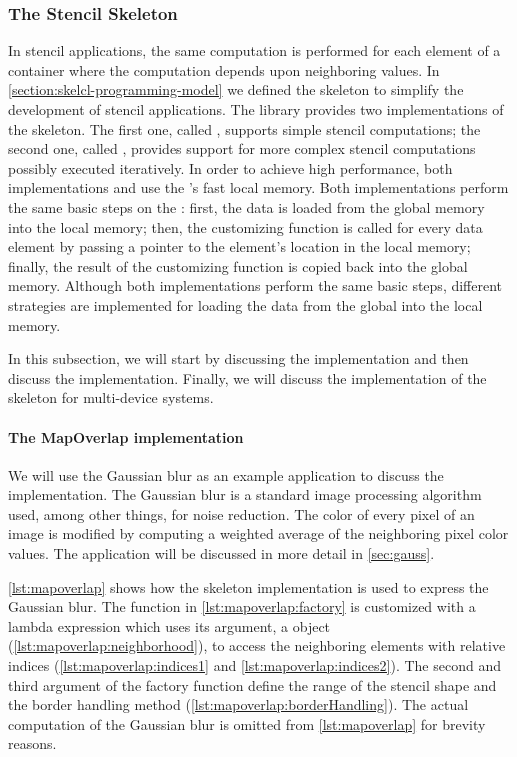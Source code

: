 \subsubsection{The Stencil Skeleton}
\label{sec:skelcl:stencil}
In stencil applications, the same computation is performed for each element of a container where the computation depends upon neighboring values.
In \autoref{section:skelcl-programming-model} we defined the \stencil skeleton to simplify the development of stencil applications.
The \SkelCL library provides two implementations of the \stencil skeleton.
The first one, called , supports simple stencil computations;
the second one, called , provides support for more complex stencil computations possibly executed iteratively.
In order to achieve high performance, both implementations  and  use the \GPU's fast local memory.
Both implementations perform the same basic steps on the \GPU:
first, the data is loaded from the global memory into the local memory;
then, the customizing function is called for every data element by passing a pointer to the element's location in the local memory;
finally, the result of the customizing function is copied back into the global memory.
Although both implementations perform the same basic steps, different strategies are implemented for loading the data from the global into the local memory.

In this subsection, we will start by discussing the  implementation and then discuss the  implementation.
Finally, we will discuss the implementation of the \stencil skeleton for multi-device systems.

\paragraph{The MapOverlap implementation}

We will use the Gaussian blur as an example application to discuss the  implementation.
The Gaussian blur is a standard image processing algorithm used, among other things, for noise reduction.
The color of every pixel of an image is modified by computing a weighted average of the neighboring pixel color values.
The application will be discussed in more detail in \autoref{sec:gauss}.

\autoref{lst:mapoverlap} shows how the  skeleton implementation is used to express the Gaussian blur.
The  function in \autoref{lst:mapoverlap:factory} is customized with a lambda expression which uses its argument, a  object (\autoref{lst:mapoverlap:neighborhood}), to access the neighboring elements with relative indices (\autoref{lst:mapoverlap:indices1} and \autoref{lst:mapoverlap:indices2}).
The second and third argument of the factory function define the range of the stencil shape and the border handling method (\autoref{lst:mapoverlap:borderHandling}).
The actual computation of the Gaussian blur is omitted from \autoref{lst:mapoverlap} for brevity reasons.

